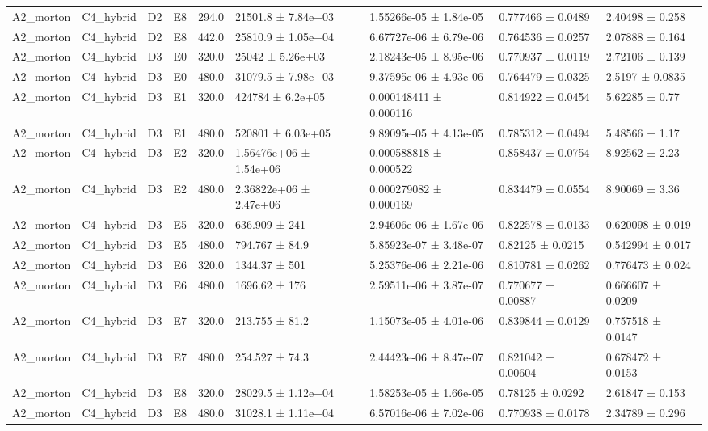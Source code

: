 \begin{table}
\begin{tabular}{lllllllll}
A2\_morton & C4\_hybrid & D2 & E8 & 294.0 & 21501.8 ± 7.84e+03 & 1.55266e-05 ± 1.84e-05 & 0.777466 ± 0.0489 & 2.40498 ± 0.258 \\
A2\_morton & C4\_hybrid & D2 & E8 & 442.0 & 25810.9 ± 1.05e+04 & 6.67727e-06 ± 6.79e-06 & 0.764536 ± 0.0257 & 2.07888 ± 0.164 \\
A2\_morton & C4\_hybrid & D3 & E0 & 320.0 & 25042 ± 5.26e+03 & 2.18243e-05 ± 8.95e-06 & 0.770937 ± 0.0119 & 2.72106 ± 0.139 \\
A2\_morton & C4\_hybrid & D3 & E0 & 480.0 & 31079.5 ± 7.98e+03 & 9.37595e-06 ± 4.93e-06 & 0.764479 ± 0.0325 & 2.5197 ± 0.0835 \\
A2\_morton & C4\_hybrid & D3 & E1 & 320.0 & 424784 ± 6.2e+05 & 0.000148411 ± 0.000116 & 0.814922 ± 0.0454 & 5.62285 ± 0.77 \\
A2\_morton & C4\_hybrid & D3 & E1 & 480.0 & 520801 ± 6.03e+05 & 9.89095e-05 ± 4.13e-05 & 0.785312 ± 0.0494 & 5.48566 ± 1.17 \\
A2\_morton & C4\_hybrid & D3 & E2 & 320.0 & 1.56476e+06 ± 1.54e+06 & 0.000588818 ± 0.000522 & 0.858437 ± 0.0754 & 8.92562 ± 2.23 \\
A2\_morton & C4\_hybrid & D3 & E2 & 480.0 & 2.36822e+06 ± 2.47e+06 & 0.000279082 ± 0.000169 & 0.834479 ± 0.0554 & 8.90069 ± 3.36 \\
A2\_morton & C4\_hybrid & D3 & E5 & 320.0 & 636.909 ± 241 & 2.94606e-06 ± 1.67e-06 & 0.822578 ± 0.0133 & 0.620098 ± 0.019 \\
A2\_morton & C4\_hybrid & D3 & E5 & 480.0 & 794.767 ± 84.9 & 5.85923e-07 ± 3.48e-07 & 0.82125 ± 0.0215 & 0.542994 ± 0.017 \\
A2\_morton & C4\_hybrid & D3 & E6 & 320.0 & 1344.37 ± 501 & 5.25376e-06 ± 2.21e-06 & 0.810781 ± 0.0262 & 0.776473 ± 0.024 \\
A2\_morton & C4\_hybrid & D3 & E6 & 480.0 & 1696.62 ± 176 & 2.59511e-06 ± 3.87e-07 & 0.770677 ± 0.00887 & 0.666607 ± 0.0209 \\
A2\_morton & C4\_hybrid & D3 & E7 & 320.0 & 213.755 ± 81.2 & 1.15073e-05 ± 4.01e-06 & 0.839844 ± 0.0129 & 0.757518 ± 0.0147 \\
A2\_morton & C4\_hybrid & D3 & E7 & 480.0 & 254.527 ± 74.3 & 2.44423e-06 ± 8.47e-07 & 0.821042 ± 0.00604 & 0.678472 ± 0.0153 \\
A2\_morton & C4\_hybrid & D3 & E8 & 320.0 & 28029.5 ± 1.12e+04 & 1.58253e-05 ± 1.66e-05 & 0.78125 ± 0.0292 & 2.61847 ± 0.153 \\
A2\_morton & C4\_hybrid & D3 & E8 & 480.0 & 31028.1 ± 1.11e+04 & 6.57016e-06 ± 7.02e-06 & 0.770938 ± 0.0178 & 2.34789 ± 0.296 \\

\end{tabular}
\end{table}
